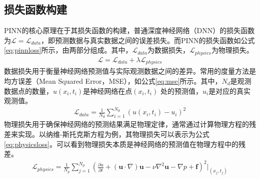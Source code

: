 \subsection{损失函数构建}
PINN的核心原理在于其损失函数的构建，普通深度神经网络（DNN）的损失函数为$\mathcal{L} = \mathcal{L}_{data}$，即预测数据与真实数据之间的误差损失。而PINN的损失函数如公式\eqref{eq:pinnloss}所示，由两部分组成。其中，$\mathcal{L}_{data}$为数据损失，$\mathcal{L}_{physics}$为物理损失。
\begin{align}
  \mathcal{L} = \mathcal{L}_{data} + \lambda\mathcal{L}_{physics} \label{eq:pinnloss}
\end{align}
数据损失用于衡量神经网络预测值与实际观测数据之间的差异。常用的度量方法是均方误差（Mean Squared Error，MSE），如公式\eqref{eq:mse}所示。其中，$N_d$是观测数据点的数量，$u(x_i, t_i)$是神经网络在点$(x_i, t_i)$ 处的预测值，$u_i$是对应的真实观测值。
\begin{align}
  \mathcal{L}_{data} = \frac{1}{N_d} \sum_{i=1}^{N_d} \left( u(x_i, t_i) - u_i \right)^2 \label{eq:mse}
\end{align}
物理损失用于确保神经网络的预测结果满足物理定律，通常通过计算物理方程的残差来实现。以纳维-斯托克斯方程为例，其物理损失可以表示为公式\eqref{eq:physicsloss}。可以看到物理损失本质是神经网络的预测值在物理方程中的残差。
\begin{align}
  \mathcal{L}_{physics} = \frac{1}{N_p} \sum_{j=1}^{N_p} \left( \frac{\partial u}{\partial t} + (\mathbf{u} \cdot \nabla) \mathbf{u} - \nu \nabla^2 \mathbf{u} - \nabla p + \mathbf{f} \right)^2 \bigg|_{(x_j, t_j)} \label{eq:physicsloss}
\end{align}
